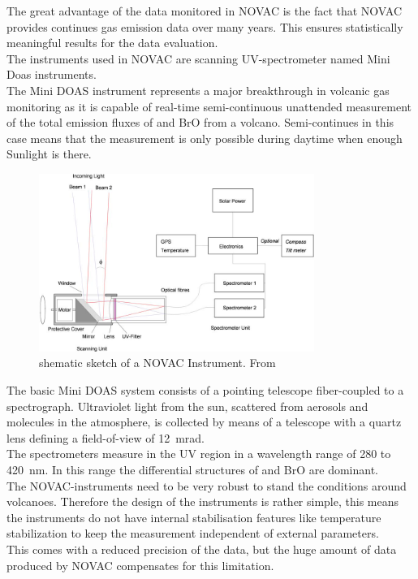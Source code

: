 		The great advantage of the data monitored in NOVAC is the fact
		that NOVAC provides continues gas emission data over many years. This ensures statistically meaningful results for the data evaluation.\\
		The instruments used in NOVAC are scanning UV-spectrometer named Mini Doas instruments. \\
		The  Mini DOAS  instrument  represents  a  major  breakthrough  in  volcanic  gas	monitoring as it is capable of real-time semi-continuous unattended measurement of the total emission fluxes of   and BrO from a volcano. Semi-continues in this case means that the measurement is only possible during daytime when enough Sunlight is there.\\
		\begin{figure}
			\centering
		 \includegraphics[width=0.8\textwidth]{Bilder/Simon/Bilder_Tung/NOVAC_Instrument}
			\caption{shematic sketch of a NOVAC Instrument. From \cite{galle2010network}}
		\end{figure}
		The  basic  Mini DOAS  system  consists  of  a  pointing  telescope  fiber-coupled  to  a  spectrograph.  
		Ultraviolet light from the sun, scattered from aerosols and molecules in the atmosphere, is collected by 
		means  of  a  telescope  with  a  quartz  lens  defining  a  field-of-view  of  12~mrad.
		\cite{NOVACsite} \\
		The spectrometers measure in the UV region in a wavelength range of 280 to 420~nm. In this range the differential structures of  and BrO are dominant.
		\\
		The NOVAC-instruments need to be very robust to stand the conditions around volcanoes. Therefore the design of the instruments is rather simple, this means the instruments do not have internal stabilisation features like temperature stabilization to keep the measurement independent of external parameters.\\
		This comes with a reduced precision of the data, but the huge amount of data produced by NOVAC compensates for this limitation.  
		
